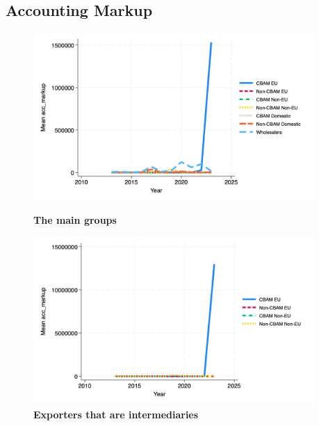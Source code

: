 \documentclass{article}
\begin{document}
\subsection{Accounting Markup}
\begin{figure}[H]
\centering
\includegraphics[width=0.95\textwidth]{acc_markup_main_groups.png}
\caption{\textbf{The main groups}}
\includegraphics[width=0.95\textwidth]{acc_markup_ei.png}
\caption{\textbf{Exporters that are intermediaries}}
\end{figure}
\end{document}

